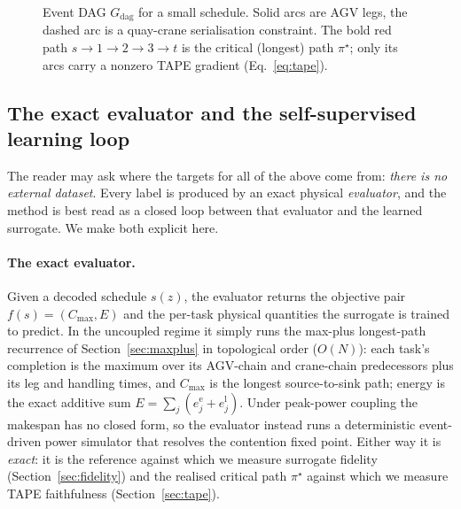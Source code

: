 \documentclass[11pt]{article}
\newcommand{\Cmax}{C_{\max}}
\begin{document}
\begin{figure}[t]
\centering
{}
\caption{Event DAG $G_{\mathrm{dag}}$ for a small schedule. Solid arcs are AGV legs, the
dashed arc is a quay-crane serialisation constraint. The bold red path $s\!\to\!1\!\to\!2\!\to\!3\!\to\!t$
is the critical (longest) path $\pi^\star$; only its arcs carry a nonzero TAPE gradient
(Eq.~\ref{eq:tape}).}
\label{fig:dag}
\end{figure}

\subsection{The exact evaluator and the self-supervised learning loop}
\label{sec:evaluator}
The reader may ask where the targets for all of the above come from: \emph{there is no
external dataset}. Every label is produced by an exact physical \emph{evaluator}, and the
method is best read as a closed loop between that evaluator and the learned surrogate. We make
both explicit here.

\paragraph{The exact evaluator.} Given a decoded schedule $s(z)$, the evaluator
returns the objective pair $f(s)=(\Cmax,E)$ and the per-task physical quantities the
surrogate is trained to predict. In the uncoupled regime it simply runs the max-plus
longest-path recurrence of Section~\ref{sec:maxplus} in topological order ($O(N)$): each
task's completion is the maximum over its AGV-chain and crane-chain predecessors plus its leg
and handling times, and $\Cmax$ is the longest source-to-sink path; energy is the exact
additive sum $E=\sum_j (e^{\mathrm e}_j+e^{\mathrm l}_j)$. Under peak-power coupling the
makespan has no closed form, so the evaluator instead runs a deterministic event-driven
power simulator that resolves the contention fixed point. Either way it is \emph{exact}: it is
the reference against which we measure surrogate fidelity
(Section~\ref{sec:fidelity}) and the realised critical path $\pi^\star$ against which we
measure TAPE faithfulness (Section~\ref{sec:tape}).
\end{document}
